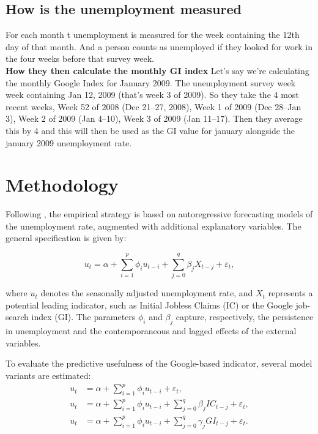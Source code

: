 \documentclass{article}
\begin{document}
\subsection{How is the unemployment measured}
For each month t unemployment is measured for the week containing the 12th day of that month.
And a person counts as unemployed if they looked for work in the four weeks before that survey week.
\\
\textbf{How they then calculate the monthly GI index}
Let’s say we’re calculating the monthly Google Index for January 2009. The unemployment survey week week containing Jan 12, 2009 (that’s week 3 of 2009). So they take the 4 most recent weeks,  Week 52 of 2008 (Dec 21–27, 2008), Week 1 of 2009 (Dec 28–Jan 3), Week 2 of 2009 (Jan 4–10), Week 3 of 2009 (Jan 11–17).
Then they average this by 4 and this will then be used as the GI value for january alongside the january 2009 unemployment rate. 


\section{Methodology}

Following \citet{DamuriMarcucci2009}, the empirical strategy is based on autoregressive forecasting models of the unemployment rate, augmented with additional explanatory variables. The general specification is given by:

\begin{equation}
u_t = \alpha + \sum_{i=1}^{p} \phi_i u_{t-i} + \sum_{j=0}^{q} \beta_j X_{t-j} + \varepsilon_t,
\end{equation}

where $u_t$ denotes the seasonally adjusted unemployment rate, and $X_t$ represents a potential leading indicator, such as Initial Jobless Claims (IC) or the Google job-search index (GI). The parameters $\phi_i$ and $\beta_j$ capture, respectively, the persistence in unemployment and the contemporaneous and lagged effects of the external variables.

To evaluate the predictive usefulness of the Google-based indicator, several model variants are estimated:
\begin{align}
u_t &= \alpha + \sum_{i=1}^{p} \phi_i u_{t-i} + \varepsilon_t, \\
u_t &= \alpha + \sum_{i=1}^{p} \phi_i u_{t-i} + \sum_{j=0}^{q} \beta_j IC_{t-j} + \varepsilon_t, \\
u_t &= \alpha + \sum_{i=1}^{p} \phi_i u_{t-i} + \sum_{j=0}^{q} \gamma_j GI_{t-j} + \varepsilon_t.
\end{align}
\end{document}
